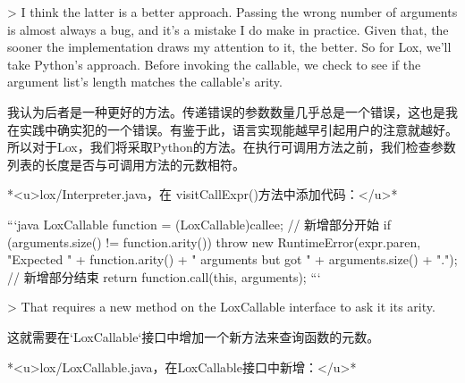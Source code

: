 \documentclass[cn,11pt,chinese]{elegantbook}
\begin{document}
> I think the latter is a better approach. Passing the wrong number of arguments is almost always a bug, and it’s a mistake I do make in practice. Given that, the sooner the implementation draws my attention to it, the better. So for Lox, we’ll take Python’s approach. Before invoking the callable, we check to see if the argument list’s length matches the callable’s arity.

我认为后者是一种更好的方法。传递错误的参数数量几乎总是一个错误，这也是我在实践中确实犯的一个错误。有鉴于此，语言实现能越早引起用户的注意就越好。所以对于Lox，我们将采取Python的方法。在执行可调用方法之前，我们检查参数列表的长度是否与可调用方法的元数相符。

*<u>lox/Interpreter.java，在 visitCallExpr()方法中添加代码：</u>*

```java
    LoxCallable function = (LoxCallable)callee;
    // 新增部分开始
    if (arguments.size() != function.arity()) {
      throw new RuntimeError(expr.paren, "Expected " +
          function.arity() + " arguments but got " +
          arguments.size() + ".");
    }
    // 新增部分结束
    return function.call(this, arguments);
```

> That requires a new method on the LoxCallable interface to ask it its arity.

这就需要在`LoxCallable`接口中增加一个新方法来查询函数的元数。

*<u>lox/LoxCallable.java，在LoxCallable接口中新增：</u>*
\end{document}
